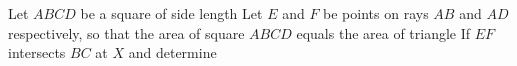 Let $ABCD$ be a square of side length  Let $E$ and $F$ be points on rays $AB$ and $AD$ respectively, so that the area of square $ABCD$ equals the area of triangle  If $EF$ intersects $BC$ at $X$ and  determine 